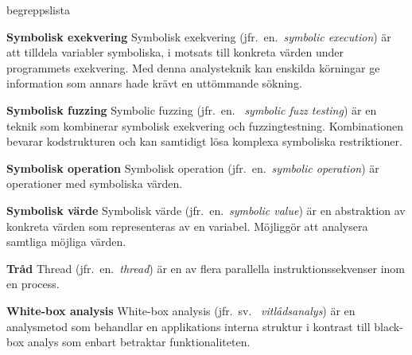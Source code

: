 \begin{labeling}{begreppslista}
    \item [\textbf{Symbolisk exekvering}] Symbolisk exekvering (jfr.\ en.\
    \emph{symbolic execution}) är att tilldela variabler symboliska, i motsats
    till konkreta värden under programmets exekvering. Med denna analysteknik
    kan enskilda körningar ge information som annars hade krävt en uttömmande
    sökning.

    \item [\textbf{Symbolisk fuzzing}] Symbolic fuzzing (jfr.\ en.
    \ \emph{symbolic fuzz testing}) är en teknik som kombinerar symbolisk
    exekvering och fuzzingtestning. Kombinationen bevarar kodstrukturen och kan
    samtidigt lösa komplexa symboliska restriktioner.

    \item [\textbf{Symbolisk operation}] Symbolisk operation (jfr.\ en.\ \emph{symbolic
        operation}) är operationer med symboliska värden.

    \item [\textbf{Symbolisk värde}] Symbolisk värde (jfr.\ en.\ \emph{symbolic value}) är en
    abstraktion av konkreta värden som representeras av en
    variabel. Möjliggör att analysera samtliga möjliga värden.

    \item [\textbf{Tråd}] Thread (jfr.\ en.\ \emph{thread}) är en av flera
    parallella instruktionssekvenser inom en process.

    \item [\textbf{White-box analysis}] White-box analysis (jfr.\ sv.
    \ \emph{vitlådsanalys}) är en analysmetod som behandlar en applikations
    interna struktur i kontrast till black-box analys som enbart betraktar
    funktionaliteten.

\end{labeling}
